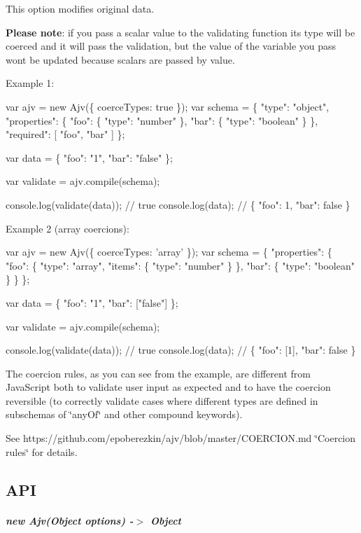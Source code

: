 This option modifies original data.

{\bfseries Please note}\+: if you pass a scalar value to the validating function its type will be coerced and it will pass the validation, but the value of the variable you pass won\textquotesingle{}t be updated because scalars are passed by value.

Example 1\+:


\begin{DoxyCode}
var ajv = new Ajv(\{ coerceTypes: true \});
var schema = \{
  "type": "object",
  "properties": \{
    "foo": \{ "type": "number" \},
    "bar": \{ "type": "boolean" \}
  \},
  "required": [ "foo", "bar" ]
\};

var data = \{ "foo": "1", "bar": "false" \};

var validate = ajv.compile(schema);

console.log(validate(data)); // true
console.log(data); // \{ "foo": 1, "bar": false \}
\end{DoxyCode}


Example 2 (array coercions)\+:


\begin{DoxyCode}
var ajv = new Ajv(\{ coerceTypes: 'array' \});
var schema = \{
  "properties": \{
    "foo": \{ "type": "array", "items": \{ "type": "number" \} \},
    "bar": \{ "type": "boolean" \}
  \}
\};

var data = \{ "foo": "1", "bar": ["false"] \};

var validate = ajv.compile(schema);

console.log(validate(data)); // true
console.log(data); // \{ "foo": [1], "bar": false \}
\end{DoxyCode}


The coercion rules, as you can see from the example, are different from Java\+Script both to validate user input as expected and to have the coercion reversible (to correctly validate cases where different types are defined in subschemas of \char`\"{}any\+Of\char`\"{} and other compound keywords).

See https\+://github.com/epoberezkin/ajv/blob/master/\+C\+O\+E\+R\+C\+I\+O\+N.\+md \char`\"{}\+Coercion rules\char`\"{} for details.

\subsection*{A\+PI}

\subparagraph*{new Ajv(\+Object options) -\/$>$ Object}

